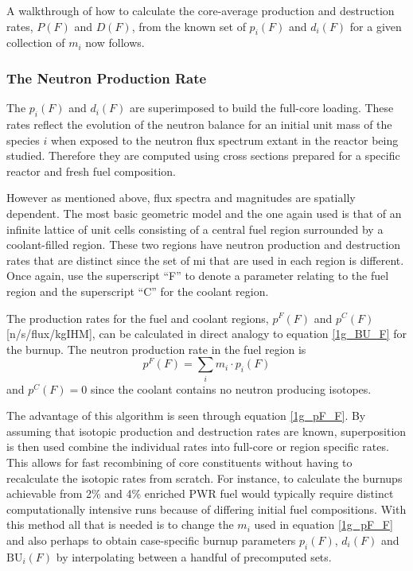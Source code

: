 A walkthrough of how to calculate the core-average production and destruction rates, $P(F)$ and $D(F)$, 
from the known set of $p_i(F)$ and $d_i(F)$ for a given collection of $m_i$ now follows.  




\subsubsection{The Neutron Production Rate}
\label{1g_sec:p_rate}
The $p_i(F)$ and $d_i(F)$ are superimposed to build the full-core loading.  These rates reflect the 
evolution of the neutron balance for an initial unit mass of the species $i$ when exposed to the 
neutron flux spectrum extant in the reactor being studied.  Therefore they are computed using cross 
sections prepared for a specific reactor and fresh fuel composition.

However as mentioned above, flux spectra and magnitudes are spatially dependent.  The most basic geometric 
model and the one again used is that of an infinite lattice of unit cells consisting of a central fuel region 
surrounded by a coolant-filled region.  These two regions have neutron production and destruction rates that 
are distinct since the set of mi that are used in each region is different.  Once again, use the 
superscript ``F'' to denote a parameter relating to the fuel region and the superscript ``C'' for the coolant 
region. 

The production rates for the fuel and coolant regions, $p^F(F)$ and $p^C(F)$ [n/s/flux/kgIHM], 
can be calculated in direct analogy to equation \ref{1g_BU_F} for the burnup.  The neutron production 
rate in the fuel region is 
\begin{equation}
\label{1g_pF_F}
p^F(F) = \sum_i m_i \cdot p_i(F)
\end{equation}
and $p^C(F) = 0$ since the coolant contains no neutron producing isotopes.  

The advantage of this algorithm is seen through equation \ref{1g_pF_F}.  By assuming that isotopic 
production and destruction rates are known, superposition is then used combine the individual rates 
into full-core or region specific rates.  This allows for fast recombining of core constituents without 
having to recalculate the isotopic rates from scratch.  For instance, to calculate the burnups achievable 
from 2\% and 4\%  enriched PWR fuel would typically require distinct computationally intensive 
runs because of differing initial fuel compositions.  With this method all that is needed is to change the 
$m_i$ used in equation \ref{1g_pF_F} and also perhaps to obtain case-specific burnup parameters $p_i(F)$, 
$d_i(F)$ and $\mbox{BU}_i(F)$ by interpolating between a handful of precomputed sets.  

